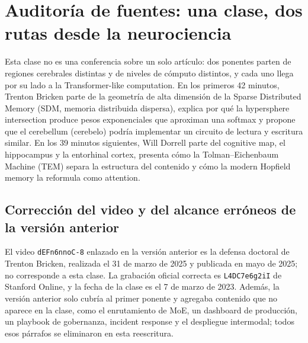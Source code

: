 \documentclass[a4paper]{article}
\begin{document}
\makecscover

\section{Auditoría de fuentes: una clase, dos rutas desde la neurociencia}

Esta clase no es una conferencia sobre un solo artículo: dos ponentes parten de regiones cerebrales distintas y de niveles de cómputo distintos, y cada uno llega por su lado a la Transformer-like computation. En los primeros 42 minutos, Trenton Bricken parte de la geometría de alta dimensión de la Sparse Distributed Memory (SDM, memoria distribuida dispersa), explica por qué la hypersphere intersection produce pesos exponenciales que aproximan una softmax y propone que el cerebellum (cerebelo) podría implementar un circuito de lectura y escritura similar. En los 39 minutos siguientes, Will Dorrell parte del cognitive map, el hippocampus y la entorhinal cortex, presenta cómo la Tolman--Eichenbaum Machine (TEM) separa la estructura del contenido y cómo la modern Hopfield memory la reformula como attention.

\subsection{Corrección del video y del alcance erróneos de la versión anterior}

El video \texttt{dEFn6nnoC-8} enlazado en la versión anterior es la defensa doctoral de Trenton Bricken, realizada el 31 de marzo de 2025 y publicada en mayo de 2025; no corresponde a esta clase. La grabación oficial correcta es \texttt{L4DC7e6g2iI} de Stanford Online, y la fecha de la clase es el 7 de marzo de 2023. Además, la versión anterior solo cubría al primer ponente y agregaba contenido que no aparece en la clase, como el enrutamiento de MoE, un dashboard de producción, un playbook de gobernanza, incident response y el despliegue intermodal; todos esos párrafos se eliminaron en esta reescritura.
\end{document}
